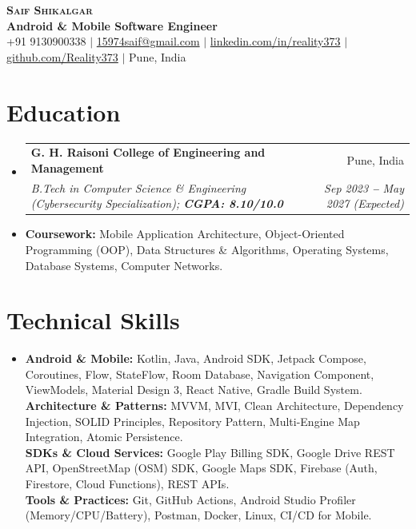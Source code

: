 \documentclass[letterpaper,9pt]{extarticle}
\makeatletter
\newcommand{\resumeSubheading}[4]{
  \vspace{-2pt}\item
    \begin{tabular*}{\linewidth}[t]{l@{\extracolsep{\fill}}r}
      \textbf{#1} & #2 \\
      \textit{\small#3} & \textit{\small #4} \\
    \end{tabular*}\vspace{-5pt}
}
\newcommand{\resumeSubHeadingListStart}{\begin{itemize}[leftmargin=0.08in, label={}]}
\newcommand{\resumeSubHeadingListEnd}{\end{itemize}\vspace{-5pt}}
\makeatother
\begin{document}
\begin{center}
    \textbf{\LARGE \scshape Saif Shikalgar} \\ \vspace{2pt}
    \small
    \textbf{Android \& Mobile Software Engineer} \\ \vspace{1.5pt}
    +91 9130900338
    $|$
    \href{mailto:15974saif@gmail.com}{15974saif@gmail.com}
    $|$
    \href{https://www.linkedin.com/in/reality373}{linkedin.com/in/reality373}
    $|$
    \href{https://github.com/Reality373}{github.com/Reality373}
    $|$
    Pune, India
\end{center}
\vspace{-6pt}

\section{Education}
  \vspace{1pt}
  \resumeSubHeadingListStart
    \resumeSubheading
      {G. H. Raisoni College of Engineering and Management}{Pune, India}
      {B.Tech in Computer Science \& Engineering (Cybersecurity Specialization); \textbf{CGPA: 8.10/10.0}}{Sep 2023 \textbf{--} May 2027 (Expected)}
      \vspace{-2pt}
      \item{
        \small{\textbf{Coursework:} Mobile Application Architecture, Object-Oriented Programming (OOP), Data Structures \& Algorithms, Operating Systems, Database Systems, Computer Networks.}
      }
  \resumeSubHeadingListEnd

\section{Technical Skills}
  \vspace{1pt}
  \resumeSubHeadingListStart
    \item{
        \small{\textbf{Android \& Mobile:}{ Kotlin, Java, Android SDK, Jetpack Compose, Coroutines, Flow, StateFlow, Room Database, Navigation Component, ViewModels, Material Design 3, React Native, Gradle Build System.}} \\ \vspace{1.5pt}
        \small{\textbf{Architecture \& Patterns:}{ MVVM, MVI, Clean Architecture, Dependency Injection, SOLID Principles, Repository Pattern, Multi-Engine Map Integration, Atomic Persistence.}} \\ \vspace{1.5pt}
        \small{\textbf{SDKs \& Cloud Services:}{ Google Play Billing SDK, Google Drive REST API, OpenStreetMap (OSM) SDK, Google Maps SDK, Firebase (Auth, Firestore, Cloud Functions), REST APIs.}} \\ \vspace{1.5pt}
        \small{\textbf{Tools \& Practices:}{ Git, GitHub Actions, Android Studio Profiler (Memory/CPU/Battery), Postman, Docker, Linux, CI/CD for Mobile.}}
    }
  \resumeSubHeadingListEnd
\end{document}
